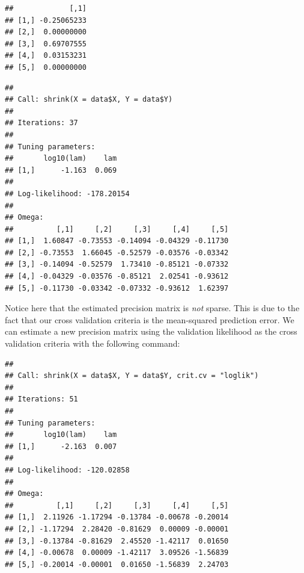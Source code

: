 \documentclass[11pt,]{report}
\newenvironment{Shaded}{\begin{snugshade}}{\end{snugshade}}
\newcommand{\CommentTok}[1]{\textcolor[rgb]{0.56,0.35,0.01}{\textit{#1}}}
\newcommand{\DataTypeTok}[1]{\textcolor[rgb]{0.13,0.29,0.53}{#1}}
\newcommand{\KeywordTok}[1]{\textcolor[rgb]{0.13,0.29,0.53}{\textbf{#1}}}
\newcommand{\NormalTok}[1]{#1}
\newcommand{\OperatorTok}[1]{\textcolor[rgb]{0.81,0.36,0.00}{\textbf{#1}}}
\newcommand{\StringTok}[1]{\textcolor[rgb]{0.31,0.60,0.02}{#1}}
\theoremstyle{definition}
\theoremstyle{definition}
\theoremstyle{definition}
\theoremstyle{remark}
\begin{document}
\begin{verbatim}
##             [,1]
## [1,] -0.25065233
## [2,]  0.00000000
## [3,]  0.69707555
## [4,]  0.03153231
## [5,]  0.00000000
\end{verbatim}

\vspace{0.5cm}

\begin{Shaded}
\end{Shaded}

\begin{verbatim}
## 
## Call: shrink(X = data$X, Y = data$Y)
## 
## Iterations: 37
## 
## Tuning parameters:
##       log10(lam)    lam
## [1,]      -1.163  0.069
## 
## Log-likelihood: -178.20154
## 
## Omega:
##          [,1]     [,2]     [,3]     [,4]     [,5]
## [1,]  1.60847 -0.73553 -0.14094 -0.04329 -0.11730
## [2,] -0.73553  1.66045 -0.52579 -0.03576 -0.03342
## [3,] -0.14094 -0.52579  1.73410 -0.85121 -0.07332
## [4,] -0.04329 -0.03576 -0.85121  2.02541 -0.93612
## [5,] -0.11730 -0.03342 -0.07332 -0.93612  1.62397
\end{verbatim}

\vspace{0.5cm}

Notice here that the estimated precision matrix is \emph{not} sparse. This is due to the fact that our cross validation criteria is the mean-squared prediction error. We can estimate a new precision matrix using the validation likelihood as the cross validation criteria with the following command:

\vspace{0.5cm}

\begin{Shaded}
\end{Shaded}

\begin{verbatim}
## 
## Call: shrink(X = data$X, Y = data$Y, crit.cv = "loglik")
## 
## Iterations: 51
## 
## Tuning parameters:
##       log10(lam)    lam
## [1,]      -2.163  0.007
## 
## Log-likelihood: -120.02858
## 
## Omega:
##          [,1]     [,2]     [,3]     [,4]     [,5]
## [1,]  2.11926 -1.17294 -0.13784 -0.00678 -0.20014
## [2,] -1.17294  2.28420 -0.81629  0.00009 -0.00001
## [3,] -0.13784 -0.81629  2.45520 -1.42117  0.01650
## [4,] -0.00678  0.00009 -1.42117  3.09526 -1.56839
## [5,] -0.20014 -0.00001  0.01650 -1.56839  2.24703
\end{verbatim}
\end{document}
